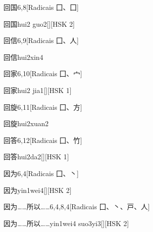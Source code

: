 \begin{entry}{回国}{6,8}[Radicais ⼞、⼞]
  \begin{phonetics}{回国}{hui2 guo2}[][HSK 2]
  \end{phonetics}
\end{entry}

\begin{entry}{回信}{6,9}[Radicais ⼞、⼈]
  \begin{phonetics}{回信}{hui2xin4}
  \end{phonetics}
\end{entry}

\begin{entry}{回家}{6,10}[Radicais ⼞、⼧]
  \begin{phonetics}{回家}{hui2 jia1}[][HSK 1]
  \end{phonetics}
\end{entry}

\begin{entry}{回旋}{6,11}[Radicais ⼞、⽅]
  \begin{phonetics}{回旋}{hui2xuan2}
  \end{phonetics}
\end{entry}

\begin{entry}{回答}{6,12}[Radicais ⼞、⽵]
  \begin{phonetics}{回答}{hui2da2}[][HSK 1]
  \end{phonetics}
\end{entry}

\begin{entry}{因为}{6,4}[Radicais ⼞、⼂]
  \begin{phonetics}{因为}{yin1wei4}[][HSK 2]
  \end{phonetics}
\end{entry}

\begin{entry}{因为……所以……}{6,4,8,4}[Radicais ⼞、⼂、⼾、⼈]
  \begin{phonetics}{因为……所以……}{yin1wei4 suo3yi3}[][HSK 2]
  \end{phonetics}
\end{entry}

